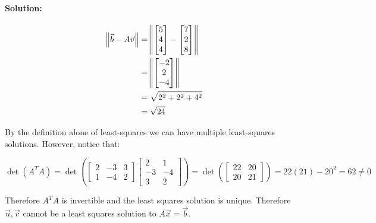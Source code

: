 \documentclass[12pt, letterpaper]{article}
\theoremstyle{statement}
\theoremstyle{statement}
\newenvironment{Solution}{\noindent\ignorespaces\paragraph{Solution:}}{\hfill \ding{122}\par\noindent}
\begin{document}
\begin{Solution}
    \begin{align*}
    \norm{\Vec{b}-A\Vec{v}} &= \norm{
    \begin{bmatrix}
    5 \\ 
    4 \\ 
    4
    \end{bmatrix}
    -
    \begin{bmatrix}
    7 \\ 
    2 \\ 
    8
    \end{bmatrix}
    } \\
    &=\norm{
    \begin{bmatrix}
    -2 \\
    2 \\
    -4
    \end{bmatrix}
    } \\
    &= \sqrt{2^2 + 2^2 + 4^2} \\
    &= \sqrt{24}
    \end{align*}
    
    By the definition alone of least-squares we can have multiple least-squares solutions. However, notice that:
    
    $$
    \det(A^T A) =
    \det\left(
    \begin{bmatrix} 
    2 & -3 & 3 \\ 
    1 & -4 & 2 
    \end{bmatrix}
    \begin{bmatrix}
    2 & 1\\
    -3 & -4\\
    3 & 2
    \end{bmatrix}
    \right)
    = 
    \det\left(
    \begin{bmatrix}
    22 & 20 \\
    20 &  21
    \end{bmatrix}
    \right)
    = 22(21)-20^2 = 62 \neq 0
    $$
    
    Therefore $A^TA$ is invertible and the least squares solution is unique. Therefore $\Vec{u}, \Vec{v}$ cannot be a least squares solution to $A\Vec{x}=\Vec{b}$.
    
    \end{Solution}
    
\end{document}

